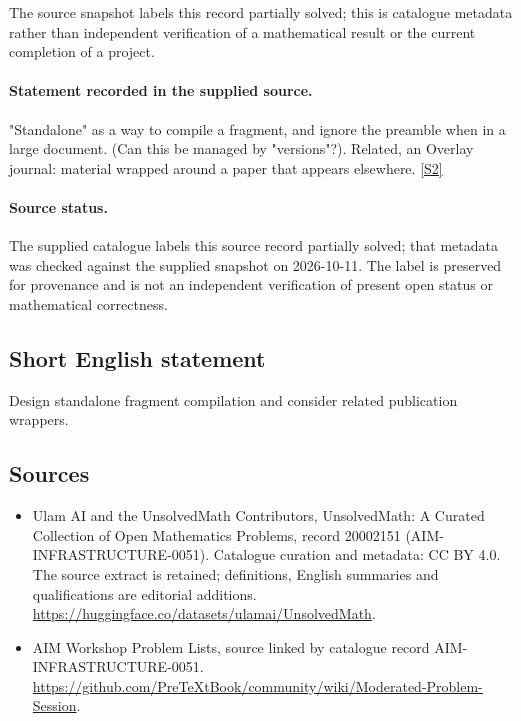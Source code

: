 \documentclass[11pt]{article}
\begin{document}
The source snapshot labels this record partially solved; this is catalogue metadata rather than independent verification of a mathematical result or the current completion of a project.
\paragraph{Statement recorded in the supplied source.}
"Standalone" as a way to compile a fragment, and ignore the preamble when in a large document. (Can this be managed by "versions"?). Related, an Overlay journal: material wrapped around a paper that appears elsewhere. \href{https://github.com/PreTeXtBook/community/wiki/Moderated-Problem-Session}{[S2]}
\paragraph{Source status.}
The supplied catalogue labels this source record partially solved; that metadata was checked against the supplied snapshot on 2026-10-11. The label is preserved for provenance and is not an independent verification of present open status or mathematical correctness.
\subsection{Short English statement}
Design standalone fragment compilation and consider related publication wrappers.
\subsection{Sources}
\begin{itemize}
\item[S1] Ulam AI and the UnsolvedMath Contributors, UnsolvedMath: A Curated Collection of Open Mathematics Problems, record 20002151 (AIM-INFRASTRUCTURE-0051). Catalogue curation and metadata: CC BY 4.0. The source extract is retained; definitions, English summaries and qualifications are editorial additions.
\url{https://huggingface.co/datasets/ulamai/UnsolvedMath}.
\item[S2] AIM Workshop Problem Lists, source linked by catalogue record AIM-INFRASTRUCTURE-0051.
\url{https://github.com/PreTeXtBook/community/wiki/Moderated-Problem-Session}.
\end{itemize}
\end{document}
